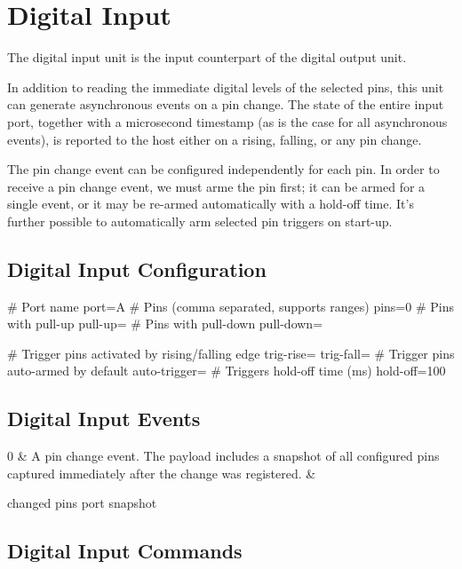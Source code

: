 \section{Digital Input}

The digital input unit is the input counterpart of the digital output unit.

In addition to reading the immediate digital levels of the selected pins, this unit can generate asynchronous events on a pin change. The state of the entire input port, together with a microsecond timestamp (as is the case for all asynchronous events), is reported to the host either on a rising, falling, or any pin change.

The pin change event can be configured independently for each pin. In order to receive a pin change event, we must arme the pin first; it can be armed for a single event, or it may be re-armed automatically with a hold-off time. It's further possible to automatically arm selected pin triggers on start-up.


\subsection{Digital Input Configuration}

\begin{inicode}
[DI:in@2]
# Port name
port=A
# Pins (comma separated, supports ranges)
pins=0
# Pins with pull-up
pull-up=
# Pins with pull-down
pull-down=

# Trigger pins activated by rising/falling edge
trig-rise=
trig-fall=
# Trigger pins auto-armed by default
auto-trigger=
# Triggers hold-off time (ms)
hold-off=100
\end{inicode}

\subsection{Digital Input Events}

\begin{cmdlist}

	0 & 
	A pin change event. The payload includes a snapshot of all configured pins captured immediately after the change was registered.
	& \begin{cmdpld}
		 changed pins
		 port snapshot
	\end{cmdpld}

\end{cmdlist}

\subsection{Digital Input Commands}

